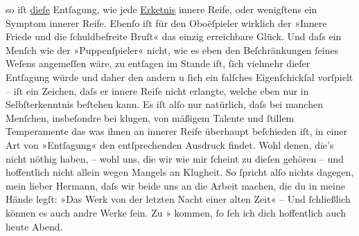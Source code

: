 \begin{ledgroupsized}[t]{13cm}
                  {\pb}so iſt \uline{dieſe} Entſagung, wie jede \uline{Erke{\geminationn}tnis} innere Reife, oder wenigſtens ein
               Symptom innerer Reife. Ebenſo iſt für den Oboëſpieler wirklich der »Innere Friede und
               die ſchuldbefreite Bruſt« das einzig erreichbare Glück. Und daſs ein Menſch wie der
                  »Puppenſpieler« nicht, wie
               es eben den Beſchränkungen ſeines Weſens angemeſſen wäre, \introOben{}zu\introOben{}
               entſagen im Stande iſt, ſich \introOben{}vielmehr\introOben{} dieſer Entſagung
                  \label{T_L01477-1v}\label{T_L01477-1h} würde
               und daher den andern u ſich ein \introOben{}falſches\introOben{} Eigenſchickſal
               vorſpielt – iſt ein Zeichen, daſs er innere Reife nicht erlangte, welche eben nur in
               Selbſterkenntnis beſtehen kann.  Es iſt {\pb}alſo nur natürlich,
               daſs bei manchen Menſchen, insbeſondre bei klugen, von mäßigem Talente und ſtillem
               Temperamente das was ihnen an innerer Reife überhaupt beſchieden iſt, in einer Art
               von »Entſagung« den entſprechenden Ausdruck findet.\pend
           \pstart
           Wohl denen, die’s nicht nöthig haben, – wohl uns, die wir wie mir ſcheint zu dieſen
               gehören – und hoffentlich nicht allein wegen Mangels an Klugheit. So ſpricht alſo
               nichts dagegen, mein lieber Hermann, daſs wir beide uns an die Arbeit machen, die du
               in meine {\pb}Hände legſt:
                  »\label{LL075-1v}Das Werk von der letzten Nacht einer alten
                  Zeit\label{LL075-1h}« – Und ſchließlich können es auch andre Werke ſein.\pend
           \pstart
           Zu »\label{K_L01477-4v}\label{K_L01477-4h}{ }kommen, ſo ſeh ich dich hoffentlich auch heute Abend.\pend

\end{ledgroupsized}
